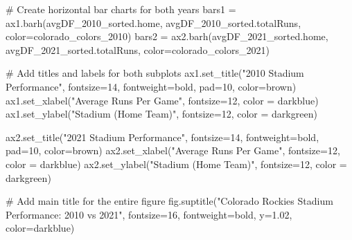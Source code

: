 \documentclass[
  letterpaper,
  DIV=11,
  numbers=noendperiod]{scrartcl}
\newenvironment{Shaded}{\begin{snugshade}}{\end{snugshade}}
\newcommand{\CommentTok}[1]{\textcolor[rgb]{0.37,0.37,0.37}{#1}}
\newcommand{\DecValTok}[1]{\textcolor[rgb]{0.68,0.00,0.00}{#1}}
\newcommand{\FloatTok}[1]{\textcolor[rgb]{0.68,0.00,0.00}{#1}}
\newcommand{\NormalTok}[1]{\textcolor[rgb]{0.00,0.23,0.31}{#1}}
\newcommand{\OperatorTok}[1]{\textcolor[rgb]{0.37,0.37,0.37}{#1}}
\newcommand{\StringTok}[1]{\textcolor[rgb]{0.13,0.47,0.30}{#1}}
\begin{document}
\begin{tcolorbox}
\begin{Shaded}
\begin{Highlighting}[]
\CommentTok{\# Create horizontal bar charts for both years}
\NormalTok{bars1 }\OperatorTok{=}\NormalTok{ ax1.barh(avgDF\_2010\_sorted.home, avgDF\_2010\_sorted.totalRuns, color}\OperatorTok{=}\NormalTok{colorado\_colors\_2010)}
\NormalTok{bars2 }\OperatorTok{=}\NormalTok{ ax2.barh(avgDF\_2021\_sorted.home, avgDF\_2021\_sorted.totalRuns, color}\OperatorTok{=}\NormalTok{colorado\_colors\_2021)}

\CommentTok{\# Add titles and labels for both subplots}
\NormalTok{ax1.set\_title(}\StringTok{"2010 Stadium Performance"}\NormalTok{, fontsize}\OperatorTok{=}\DecValTok{14}\NormalTok{, fontweight}\OperatorTok{=}\StringTok{\textquotesingle{}bold\textquotesingle{}}\NormalTok{, pad}\OperatorTok{=}\DecValTok{10}\NormalTok{, color}\OperatorTok{=}\StringTok{\textquotesingle{}brown\textquotesingle{}}\NormalTok{)}
\NormalTok{ax1.set\_xlabel(}\StringTok{"Average Runs Per Game"}\NormalTok{, fontsize}\OperatorTok{=}\DecValTok{12}\NormalTok{, color }\OperatorTok{=} \StringTok{\textquotesingle{}darkblue\textquotesingle{}}\NormalTok{)}
\NormalTok{ax1.set\_ylabel(}\StringTok{"Stadium (Home Team)"}\NormalTok{, fontsize}\OperatorTok{=}\DecValTok{12}\NormalTok{, color }\OperatorTok{=} \StringTok{\textquotesingle{}darkgreen\textquotesingle{}}\NormalTok{)}

\NormalTok{ax2.set\_title(}\StringTok{"2021 Stadium Performance"}\NormalTok{, fontsize}\OperatorTok{=}\DecValTok{14}\NormalTok{, fontweight}\OperatorTok{=}\StringTok{\textquotesingle{}bold\textquotesingle{}}\NormalTok{, pad}\OperatorTok{=}\DecValTok{10}\NormalTok{, color}\OperatorTok{=}\StringTok{\textquotesingle{}brown\textquotesingle{}}\NormalTok{)}
\NormalTok{ax2.set\_xlabel(}\StringTok{"Average Runs Per Game"}\NormalTok{, fontsize}\OperatorTok{=}\DecValTok{12}\NormalTok{, color }\OperatorTok{=} \StringTok{\textquotesingle{}darkblue\textquotesingle{}}\NormalTok{)}
\NormalTok{ax2.set\_ylabel(}\StringTok{"Stadium (Home Team)"}\NormalTok{, fontsize}\OperatorTok{=}\DecValTok{12}\NormalTok{, color }\OperatorTok{=} \StringTok{\textquotesingle{}darkgreen\textquotesingle{}}\NormalTok{)}

\CommentTok{\# Add main title for the entire figure}
\NormalTok{fig.suptitle(}\StringTok{"Colorado Rockies Stadium Performance: 2010 vs 2021"}\NormalTok{, }
\NormalTok{             fontsize}\OperatorTok{=}\DecValTok{16}\NormalTok{, fontweight}\OperatorTok{=}\StringTok{\textquotesingle{}bold\textquotesingle{}}\NormalTok{, y}\OperatorTok{=}\FloatTok{1.02}\NormalTok{, color}\OperatorTok{=}\StringTok{\textquotesingle{}darkblue\textquotesingle{}}\NormalTok{)}


\end{Highlighting}
\end{Shaded}
\end{tcolorbox}
\end{document}
